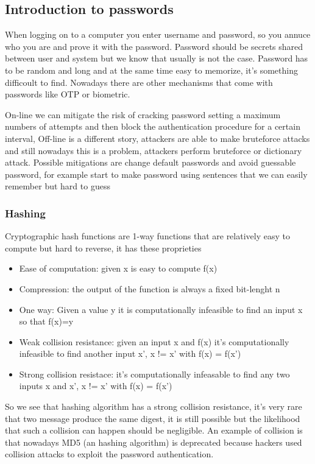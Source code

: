     \subsection{Introduction to passwords}
    When logging on to a computer you enter username and password, so you annuce who you are and prove it with the password. Password should be secrets shared between user and system but we know that usually is not the case.
    Password has to be random and long and at the same time easy to memorize, it's something difficoult to find. Nowadays there are other mechanisms that come with passwords like OTP or biometric.
    
    On-line we can mitigate the risk of cracking password setting a maximum numbers of attempts and then block the authentication procedure for a certain interval, Off-line is a different story, attackers are able to make bruteforce attacks and still nowadays this is a problem, attackers perform bruteforce or dictionary attack. Possible mitigations are change default passwords and avoid guessable password, for example start to make password using sentences that we can easily remember but hard to guess
    
    \subsubsection{Hashing}
    Cryptographic hash functions are 1-way functions that are relatively easy to compute but hard to reverse, it has these proprieties
    \begin{itemize}
        \item Ease of computation: given x is easy to compute f(x)
        \item Compression: the output of the function is always a fixed bit-lenght n
        \item One way: Given a value y it is computationally infeasible to find an input x so that f(x)=y
        \item Weak collision resistance: given an input x and f(x) it's computationally infeasible to find another input x', x != x' with f(x) = f(x')
        \item Strong collision resistace: it's computationally infeasable to find any two inputs x and x', x != x' with f(x) = f(x')
    \end{itemize}
     So we see that hashing algorithm has a strong collision resistance, it's very rare that two message produce the same digest, it is still possible but the likelihood that such a collision can happen should be negligible. An example of collision is that nowadays MD5 (an hashing algorithm) is deprecated because hackers used collision attacks to exploit the password authentication.
     
